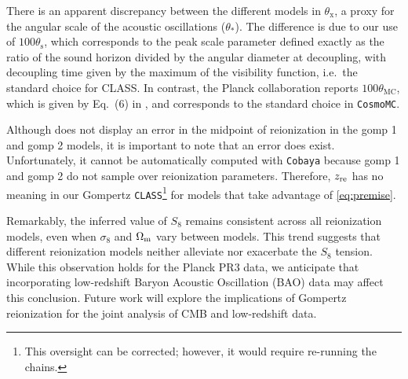 There is an apparent discrepancy between the different models in
$\theta_\mathrm{x}$, a proxy for the angular scale of the acoustic
oscillations ($\theta_*$).
The difference is due to our use of $100\theta_\mathrm{s}$, which
corresponds to the peak scale parameter defined exactly as the
ratio of the sound horizon divided by the angular diameter at
decoupling, with decoupling time given by the maximum of the visibility
function, i.e.\ the standard choice for CLASS.
In contrast, the Planck collaboration reports $100\theta_\mathrm{MC}$,
which is given by Eq.~(6) in \cite{Planck2014}, and corresponds to the
standard choice in \texttt{CosmoMC}\cite{Lewis2002}.

Although  does not display an error in the midpoint of
reionization in the gomp 1 and gomp 2 models, it is important to note that an error
does exist. Unfortunately, it cannot be automatically computed with \texttt{Cobaya} because
gomp 1 and gomp 2 do not sample over reionization parameters. Therefore,
$z_{\mathrm{re}}$ has no meaning in our Gompertz \texttt{CLASS}\footnote{This oversight
can be corrected; however, it would require re-running the chains.} for models
that take advantage of \cref{eq:premise}.

Remarkably, the inferred value of $S_8$ remains consistent across all reionization
models, even when $\sigma_8$ and $\Omega_\mathrm{m}$ vary between models. This trend
suggests that different reionization models neither alleviate nor exacerbate the $S_8$
tension. While this observation holds for the Planck PR3 data, we anticipate that
incorporating low-redshift Baryon Acoustic Oscillation (BAO) data may affect this
conclusion. Future work will explore the implications of Gompertz reionization
for the joint analysis of CMB and low-redshift data.


\FloatBarrier
